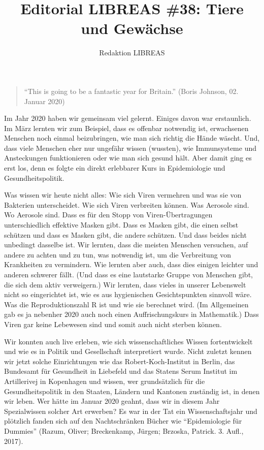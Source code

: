 \documentclass[a4paper,
fontsize=11pt,
oneside,
numbers=noperiodatend,
parskip=half-,
bibliography=totoc,
final
]{scrartcl}
\title{\LARGE{Editorial LIBREAS \#38: Tiere und Gewächse}}%
\author{Redaktion LIBREAS} %
\date{}
\begin{document}
\maketitle
\thispagestyle{fancyplain} 


\begin{quote}
\enquote{This is going to be a fantastic year for Britain.} (Boris
Johnson, 02. Januar 2020)
\end{quote}

Im Jahr 2020 haben wir gemeinsam viel gelernt. Einiges davon war
erstaunlich. Im März lernten wir zum Beispiel, dass es offenbar
notwendig ist, erwachsenen Menschen noch einmal beizubringen, wie man
sich richtig die Hände wäscht. Und, dass viele Menschen eher nur
ungefähr wissen (wussten), wie Immunsysteme und Ansteckungen
funktionieren oder wie man sich gesund hält. Aber damit ging es erst
los, denn es folgte ein direkt erlebbarer Kurs in Epidemiologie und
Gesundheitspolitik.

Was wissen wir heute nicht alles: Wie sich Viren vermehren und was sie
von Bakterien unterscheidet. Wie sich Viren verbreiten können. Was
Aerosole sind. Wo Aerosole sind. Dass es für den Stopp von
Viren-Übertragungen unterschiedlich effektive Masken gibt. Dass es
Masken gibt, die einen selbst schützen und dass es Masken gibt, die
andere schützen. Und dass beides nicht unbedingt dasselbe ist. Wir
lernten, dass die meisten Menschen versuchen, auf andere zu achten und
zu tun, was notwendig ist, um die Verbreitung von Krankheiten zu
vermindern. Wie lernten aber auch, dass dies einigen leichter und
anderen schwerer fällt. (Und dass es eine lautstarke Gruppe von Menschen
gibt, die sich dem aktiv verweigern.) Wir lernten, dass vieles in
unserer Lebenswelt nicht so eingerichtet ist, wie es aus hygienischen
Gesichtspunkten sinnvoll wäre. Was die Reproduktionszahl R ist und wie
sie berechnet wird. (Im Allgemeinen gab es ja nebenher 2020 auch noch
einen Auffrischungskurs in Mathematik.) Dass Viren gar keine Lebewesen
sind und somit auch nicht sterben können.

Wir konnten auch live erleben, wie sich wissenschaftliches Wissen
fortentwickelt und wie es in Politik und Gesellschaft interpretiert
wurde. Nicht zuletzt kennen wir jetzt solche Einrichtungen wie das
Robert-Koch-Institut in Berlin, das Bundesamt für Gesundheit in
Liebefeld und das Statens Serum Institut im Artillerivej in Kopenhagen
und wissen, wer grundsätzlich für die Gesundheitspolitik in den Staaten,
Ländern und Kantonen zuständig ist, in denen wir leben. Wer hätte im
Januar 2020 geahnt, dass wir in diesem Jahr Spezialwissen solcher Art
erwerben? Es war in der Tat ein Wissenschaftsjahr und plötzlich fanden
sich auf den Nachtschränken Bücher wie \enquote{Epidemiologie für
Dummies} (Razum, Oliver; Breckenkamp, Jürgen; Brzoska, Patrick. 3.
Aufl., 2017).
\end{document}
